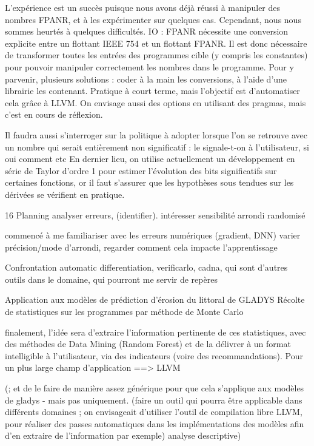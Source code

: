 \documentclass[a4paper,11pt]{report}
\begin{document}
L’expérience est un succès puisque nous avons déjà réussi à manipuler des nombres FPANR, et à les expérimenter sur quelques cas.
Cependant, nous nous sommes heurtés à quelques difficultés.
IO : FPANR nécessite une conversion explicite entre un flottant IEEE 754 et un flottant FPANR. Il est donc nécessaire de transformer toutes les entrées des programmes cible (y compris les constantes) pour pouvoir manipuler correctement les nombres dans le programme. 
Pour y parvenir, plusieurs solutions : coder à la main les conversions, à l’aide d’une librairie les contenant. Pratique à court terme, mais l’objectif est d’automatiser cela grâce à LLVM.
On envisage aussi des options en utilisant des pragmas, mais c’est en cours de réflexion.

Il faudra aussi s’interroger sur la politique à adopter lorsque l’on se retrouve avec un nombre qui serait entièrement non significatif : le signale-t-on à l’utilisateur, si oui comment etc
En dernier lieu, on utilise actuellement un développement en série de Taylor d’ordre 1 pour estimer l’évolution des bits significatifs sur certaines fonctions, or il faut s’assurer que les hypothèses sous tendues sur les dérivées se vérifient en pratique.


16 Planning
analyser erreurs, (identifier).
intéresser sensibilité arrondi randomisé

commencé à me familiariser avec les erreurs numériques (gradient, DNN)
varier précision/mode d’arrondi, regarder comment cela impacte l’apprentissage

Confrontation
automatic differentiation, verificarlo, cadna, qui sont d’autres outils dans le domaine, qui pourront me servir de repères

Application aux modèles de prédiction d’érosion du littoral de GLADYS
Récolte de statistiques sur les programmes par méthode de Monte Carlo

finalement, l’idée sera d’extraire l’information pertinente de ces statistiques, avec des méthodes de Data Mining (Random Forest)
et de la délivrer à un format intelligible à l’utilisateur, via des indicateurs (voire des recommandations).
Pour un plus large champ d’application ==> LLVM

 (; et de le faire de manière assez générique pour que cela s’applique aux modèles de gladys - mais pas uniquement.
(faire un outil qui pourra être applicable dans différents domaines ; on envisageait d’utiliser l’outil de compilation libre LLVM, pour réaliser des passes automatiques dans les implémentations des modèles afin d’en extraire de l’information par exemple)
analyse descriptive)
\end{document}
